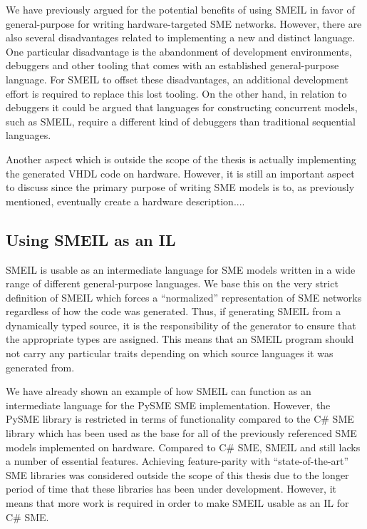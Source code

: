 

We have previously argued for the potential benefits of using SMEIL in favor of
general-purpose for writing hardware-targeted SME networks. However, there are
also several disadvantages related to implementing a new and distinct
language. One particular disadvantage is the abandonment of development
environments, debuggers and other tooling that comes with an established
general-purpose language. For SMEIL to offset these disadvantages, an additional
development effort is required to replace this lost tooling. On the other hand,
in relation to debuggers it could be argued that languages for constructing
concurrent models, such as SMEIL, require a different kind of debuggers than
traditional sequential languages.


Another aspect which is outside the scope of the thesis is actually implementing
the generated VHDL code on hardware. However, it is still an important aspect to
discuss since the primary purpose of writing SME models is to, as previously
mentioned, eventually create a hardware description....


\subsection{Using SMEIL as an IL}
SMEIL is usable as an intermediate language for SME models written in a wide
range of different general-purpose languages. We base this on the very strict
definition of SMEIL which forces a ``normalized'' representation of SME networks
regardless of how the code was generated. Thus, if generating SMEIL from a
dynamically typed source, it is the responsibility of the generator to ensure
that the appropriate types are assigned. This means that an SMEIL program should
not carry any particular traits depending on which source languages it was
generated from.

We have already shown an example of how SMEIL can function as an intermediate
language for the PySME SME implementation. However, the PySME library is
restricted in terms of functionality compared to the C\# SME library which has
been used as the base for all of the previously referenced SME models
implemented on hardware. Compared to C\# SME, SMEIL and \libsme{} still lacks a
number of essential features. Achieving feature-parity with ``state-of-the-art''
SME libraries was considered outside the scope of this thesis due to the longer
period of time that these libraries has been under development. However, it
means that more work is required in order to make SMEIL usable as an IL for C\#
SME.

